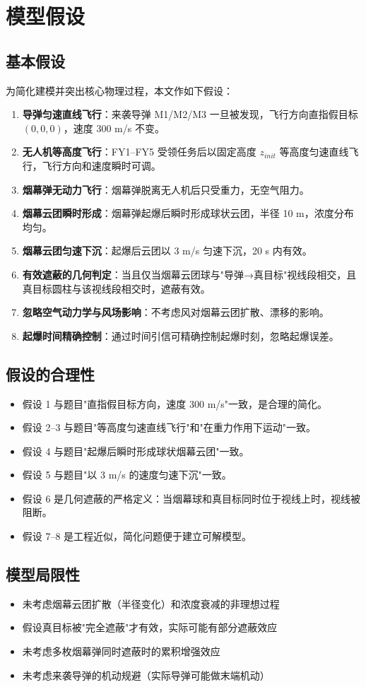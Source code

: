 \section{模型假设}
\subsection{基本假设}

为简化建模并突出核心物理过程，本文作如下假设：

\begin{enumerate}
  \item \textbf{导弹匀速直线飞行}：来袭导弹 M1/M2/M3 一旦被发现，飞行方向直指假目标 $(0, 0, 0)$，速度 300 m/s 不变。
  \item \textbf{无人机等高度飞行}：FY1--FY5 受领任务后以固定高度 $z_{init}$ 等高度匀速直线飞行，飞行方向和速度瞬时可调。
  \item \textbf{烟幕弹无动力飞行}：烟幕弹脱离无人机后只受重力，无空气阻力。
  \item \textbf{烟幕云团瞬时形成}：烟幕弹起爆后瞬时形成球状云团，半径 10 m，浓度分布均匀。
  \item \textbf{烟幕云团匀速下沉}：起爆后云团以 3 m/s 匀速下沉，20 s 内有效。
  \item \textbf{有效遮蔽的几何判定}：当且仅当烟幕云团球与"导弹→真目标"视线段相交，且真目标圆柱与该视线段相交时，遮蔽有效。
  \item \textbf{忽略空气动力学与风场影响}：不考虑风对烟幕云团扩散、漂移的影响。
  \item \textbf{起爆时间精确控制}：通过时间引信可精确控制起爆时刻，忽略起爆误差。
\end{enumerate}

\subsection{假设的合理性}

\begin{itemize}
  \item 假设 1 与题目"直指假目标方向，速度 300 m/s"一致，是合理的简化。
  \item 假设 2--3 与题目"等高度匀速直线飞行"和"在重力作用下运动"一致。
  \item 假设 4 与题目"起爆后瞬时形成球状烟幕云团"一致。
  \item 假设 5 与题目"以 3 m/s 的速度匀速下沉"一致。
  \item 假设 6 是几何遮蔽的严格定义：当烟幕球和真目标同时位于视线上时，视线被阻断。
  \item 假设 7--8 是工程近似，简化问题便于建立可解模型。
\end{itemize}

\subsection{模型局限性}

\begin{itemize}
  \item 未考虑烟幕云团扩散（半径变化）和浓度衰减的非理想过程
  \item 假设真目标被"完全遮蔽"才有效，实际可能有部分遮蔽效应
  \item 未考虑多枚烟幕弹同时遮蔽时的累积增强效应
  \item 未考虑来袭导弹的机动规避（实际导弹可能做末端机动）
\end{itemize}
